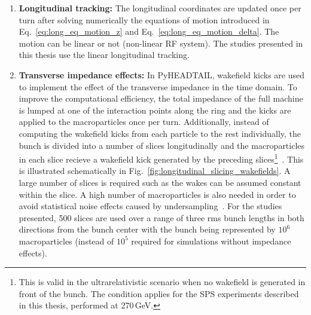 {\begin{enumerate}
    \item \textbf{Longitudinal tracking:}  %
    The longitudinal coordinates are updated once per turn after solving numerically the equations of motion introduced in Eq.~\eqref{eq:long_eq_motion_z} and Eq.~\eqref{eq:long_eq_motion_delta}. The motion can be linear or not (non-linear RF system). The studies presented in this thesis use the linear longitudinal tracking.

    \item \textbf{Transverse impedance effects:} In PyHEADTAIL, wakefield kicks are used to implement the effect of the transverse impedance in the time domain. To improve the computational efficiency, the total impedance of the full machine is lumped at one of the interaction points along the ring and the kicks are applied to the macroparticles once per turn. Additionally, instead of computing the wakefield kicks from each particle to the rest individually, the bunch is divided into a number of slices longitudinally and the macroparticles in each slice recieve a wakefield kick generated by the preceding slices\footnote{This is valid in the ultrarelativistic scenario when no wakefield is generated in front of the bunch. The condition applies for the SPS experiments described in this thesis, performed at 270\,GeV.}~\cite{Salvant:1274254}. This is illustrated schematically in Fig.~\ref{fig:longitudinal_slicing_wakefields}. A large number of slices is required such as the wakes can be assumed constant within the slice. A high number of macroparticles is also needed in order to avoid statistical noise effects caused by undersampling~\cite{pyheadtail_manual_adrian}. For the studies presented, 500 slices are used over a range of three rms bunch lengths in both directions from the bunch center with the bunch being represented by $10^6$ macroparticles (instead of $10^5$ required for simulations without impedance effects).
    



\end{enumerate}}
